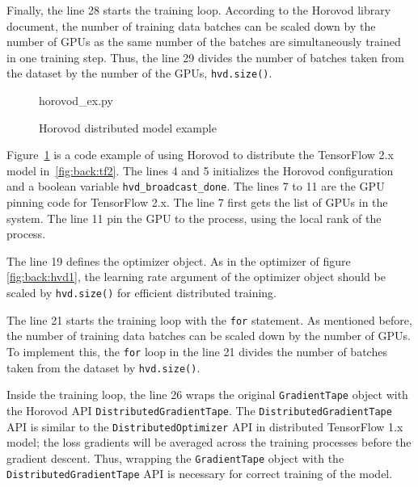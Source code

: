Finally, the line 28 starts the training loop.
According to the Horovod library document, the number of training data
batches can be scaled down by the number of GPUs as the same number of
the batches are simultaneously trained in one training step.
Thus, the line 29 divides the number of batches taken from the dataset
by the number of the GPUs, {\tt hvd.size()}.


\begin{figure}[ht!]
 
{horovod_ex.py}
  \caption{Horovod distributed model example}
\label{fig:back:hvd2} 
\end{figure}

Figure~\ref{fig:back:hvd2} is a code example of using Horovod to distribute
the TensorFlow 2.x model in~\ref{fig:back:tf2}.
The lines 4 and 5 initializes the Horovod configuration and a boolean variable
{\tt hvd\_broadcast\_done}.
The lines 7 to 11 are the GPU pinning code for TensorFlow 2.x. 
The line 7 first gets the list of GPUs in the system.
The line 11 pin the GPU to the process, using the local rank of the process.

The line 19 defines the optimizer object.
As in the optimizer of figure \ref{fig:back:hvd1}, 
the learning rate argument of the optimizer object 
should be scaled by {\tt hvd.size()} for efficient distributed training. 

The line 21 starts the training loop with the {\tt for} statement.
As mentioned before, the number of training data batches can be
scaled down by the number of GPUs.
To implement this, the {\tt for} loop in the line 21
divides the number of batches taken from the dataset by {\tt hvd.size()}.

Inside the training loop,
the line 26 wraps the original {\tt GradientTape} object with the Horovod API  
{\tt DistributedGradientTape}.
The {\tt DistributedGradientTape} API is similar
to the {\tt DistributedOptimizer} API in distributed TensorFlow 1.x model; 
the loss gradients will be averaged across the training processes 
before the gradient descent.
Thus, wrapping the {\tt GradientTape} object with the 
{\tt DistributedGradientTape} API is necessary for correct training
of the model.

